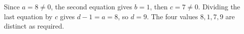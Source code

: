 Since $a=8\ne0$, the second equation gives $b=1$, then $c=7\ne0$. Dividing the last equation by $c$ gives $d-1=a=8$, so $\boxed{d=9}$. The four values $8,1,7,9$ are distinct as required.
